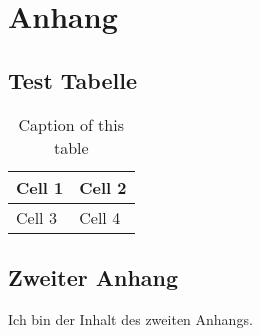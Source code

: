 \section{Anhang}

\subsection{Test Tabelle}
\begin{table}[h!]
\centering
    \begin{tabular}{l | l}
        Cell 1 & Cell 2 \\ \hline
        Cell 3 & Cell 4
    \end{tabular}
    \caption{Caption of this table}
    \label{app:firstappendix}   
\end{table}

\subsection{Zweiter Anhang}
\label{app:secondappendix}

Ich bin der Inhalt des zweiten Anhangs.
